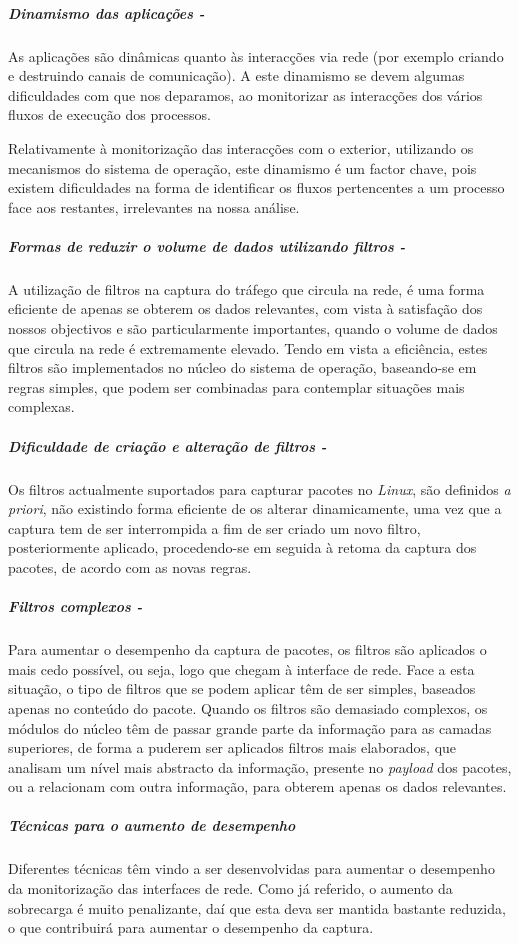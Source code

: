 \subparagraph*{Dinamismo das aplicações - }
As aplicações são dinâmicas quanto às interacções via rede (por exemplo criando e destruindo canais de comunicação).
A este dinamismo se devem algumas dificuldades com que nos deparamos, ao monitorizar as interacções dos vários fluxos de execução dos processos.

Relativamente à monitorização das interacções com o exterior, utilizando os mecanismos do sistema de operação, este dinamismo é um factor chave, pois existem dificuldades na forma de identificar os fluxos pertencentes a um processo face aos restantes, irrelevantes na nossa análise.

\subparagraph*{Formas de reduzir o volume de dados utilizando filtros - }
A utilização de filtros na captura do tráfego que circula na rede, é uma forma eficiente de apenas se obterem os dados relevantes, com vista à satisfação dos nossos objectivos e são particularmente importantes, quando o volume de dados que circula na rede é extremamente elevado.
Tendo em vista a eficiência, estes filtros são implementados no núcleo do sistema de operação, baseando-se em regras simples, que podem ser combinadas para contemplar situações mais complexas.

\subparagraph*{Dificuldade de criação e alteração de filtros - }
Os filtros actualmente suportados para capturar pacotes no \textit{Linux}, são definidos \textit{a priori}, não existindo forma eficiente de os alterar dinamicamente, uma vez que a captura tem de ser interrompida a fim de ser criado um novo filtro, posteriormente aplicado, procedendo-se em seguida à retoma da captura dos pacotes, de acordo com as novas regras.

\subparagraph*{Filtros complexos - }
Para aumentar o desempenho da captura de pacotes, os filtros são aplicados o mais cedo possível, ou seja, logo que chegam à interface de rede.
Face a esta situação, o tipo de filtros que se podem aplicar têm de ser simples, baseados apenas no conteúdo do pacote.
Quando os filtros são demasiado complexos, os módulos do núcleo têm de passar grande parte da informação para as camadas superiores, de forma a puderem ser aplicados filtros mais elaborados, que analisam um nível mais abstracto da informação, presente no \textit{payload} dos pacotes, ou a relacionam com outra informação, para obterem apenas os dados relevantes.

\subparagraph*{Técnicas para o aumento de desempenho}

Diferentes técnicas têm vindo a ser desenvolvidas para aumentar o desempenho da monitorização das interfaces de rede.
Como já referido, o aumento da sobrecarga é muito penalizante, daí que esta deva ser mantida bastante reduzida, o que contribuirá para aumentar o desempenho da captura.

